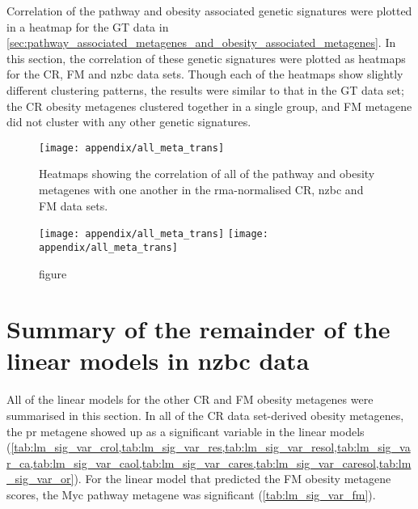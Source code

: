 \begin{appendices}
	Correlation of the pathway and obesity associated genetic signatures were plotted in a heatmap for the GT data in \cref{sec:pathway_associated_metagenes_and_obesity_associated_metagenes}.
	In this section, the correlation of these genetic signatures were plotted as heatmaps for the CR, FM and \gls{nzbc} data sets.
	Though each of the heatmaps show slightly different clustering patterns, the results were similar to that in the GT data set; the CR obesity metagenes clustered together in a single group, and FM metagene did not cluster with any other genetic signatures.

	\begin{figure}[htp!]
		\centering
		\texttt{[image: appendix/all\_meta\_trans]}
		\caption[Heatmaps of the Pearson correlation of all the obesity and the pathway metagenes with one another in the \gls{rma}-normalised CR, \gls{nzbc} and FM data]{Heatmaps showing the correlation of all of the pathway and obesity metagenes with one another in the \gls{rma}-normalised CR, \gls{nzbc} and FM data sets.
		}
		\label{fig:appendix/all_meta_other_data}
	\end{figure}

	\begin{figure}[htpb]
		\ContinuedFloat
		\captionsetup{list=off,format=cont}
		\centering
		\texttt{[image: appendix/all\_meta\_trans]}
		\texttt{[image: appendix/all\_meta\_trans]}
		\caption[]{figure}
	\end{figure}

	\newpage

	\section{Summary of the remainder of the linear models in \gls{nzbc} data}
	\label{sec:summary_of_the_linear_models_in_nzbc_data}

	All of the linear models for the other CR and FM obesity metagenes were summarised in this section.
	In all of the CR data set-derived obesity metagenes, the \gls{pr} metagene showed up as a significant variable in the linear models (\cref{tab:lm_sig_var_crol,tab:lm_sig_var_res,tab:lm_sig_var_resol,tab:lm_sig_var_ca,tab:lm_sig_var_caol,tab:lm_sig_var_cares,tab:lm_sig_var_caresol,tab:lm_sig_var_or}).
	For the linear model that predicted the FM obesity metagene scores, the Myc pathway metagene was significant (\cref{tab:lm_sig_var_fm}).


\end{appendices}
